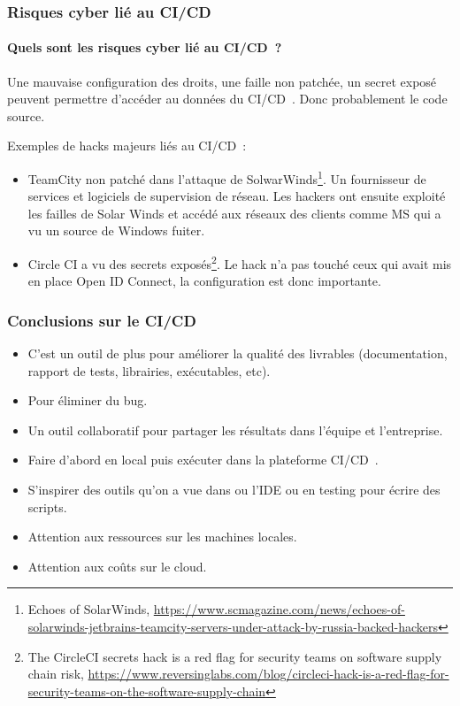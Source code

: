 \documentclass{beamer}
\begin{document}
    \begin{frame}
        \frametitle{Risques cyber lié au CI/CD}
        \framesubtitle{Quels sont les risques cyber lié au CI/CD~?}
        \transdissolve
        \pause
        Une mauvaise configuration des droits, une faille non patchée, un secret exposé peuvent permettre d'accéder au données du CI/CD~.
        Donc probablement le code source.

        Exemples de hacks majeurs liés au CI/CD~:
        \begin{itemize}
            \item TeamCity non patché dans l'attaque de SolwarWinds\footnote{Echoes of SolarWinds, \url{https://www.scmagazine.com/news/echoes-of-solarwinds-jetbrains-teamcity-servers-under-attack-by-russia-backed-hackers}}.
            Un fournisseur de services et logiciels de supervision de réseau.
            Les hackers ont ensuite exploité les failles de Solar Winds et accédé aux réseaux des clients comme MS qui a vu un source de Windows fuiter.
            \item Circle CI a vu des secrets exposés\footnote{The CircleCI secrets hack is a red flag for security teams on software supply chain risk, \url{https://www.reversinglabs.com/blog/circleci-hack-is-a-red-flag-for-security-teams-on-the-software-supply-chain}}.
            Le hack n'a pas touché ceux qui avait mis en place Open ID Connect, la configuration est donc importante.
        \end{itemize}
    \end{frame}

    \begin{frame}
        \frametitle{Conclusions sur le CI/CD}
        \transdissolve
        \begin{itemize}
            \item C'est un outil de plus pour améliorer la qualité des livrables (documentation, rapport de tests, librairies, exécutables, etc).
            \item Pour éliminer du bug.
            \item Un outil collaboratif pour partager les résultats dans l'équipe et l'entreprise.
            \item Faire d'abord en local puis exécuter dans la plateforme CI/CD~.
            \item S'inspirer des outils qu'on a vue dans ou l'IDE ou en testing pour écrire des scripts.
            \item Attention aux ressources sur les machines locales.
            \item Attention aux coûts sur le cloud.
        \end{itemize}
    \end{frame}
\end{document}
